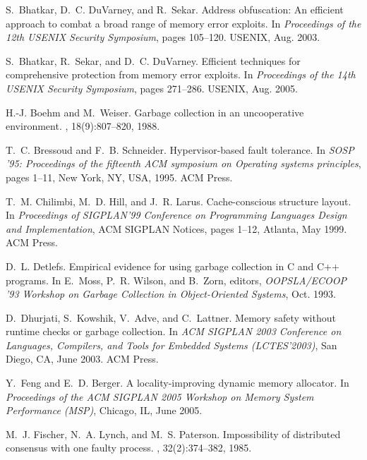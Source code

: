 \documentclass{sig-alternate}
\begin{document}
\begin{thebibliography}{10}
S.~Bhatkar, D.~C. DuVarney, and R.~Sekar.
\newblock Address obfuscation: An efficient approach to combat a broad range of
  memory error exploits.
\newblock In {\em Proceedings of the 12th USENIX Security Symposium}, pages
  105--120. USENIX, Aug. 2003.

S.~Bhatkar, R.~Sekar, and D.~C. DuVarney.
\newblock Efficient techniques for comprehensive protection from memory error
  exploits.
\newblock In {\em Proceedings of the 14th USENIX Security Symposium}, pages
  271--286. USENIX, Aug. 2005.

H.-J. Boehm and M.~Weiser.
\newblock Garbage collection in an uncooperative environment.
, 18(9):807--820, 1988.

T.~C. Bressoud and F.~B. Schneider.
\newblock Hypervisor-based fault tolerance.
\newblock In {\em SOSP '95: Proceedings of the fifteenth ACM symposium on
  Operating systems principles}, pages 1--11, New York, NY, USA, 1995. ACM
  Press.

T.~M. Chilimbi, M.~D. Hill, and J.~R. Larus.
\newblock Cache-conscious structure layout.
\newblock In {\em Proceedings of {SIGPLAN'99} Conference on Programming
  Languages Design and Implementation}, ACM SIGPLAN Notices, pages 1--12,
  Atlanta, May 1999. ACM Press.

D.~L. Detlefs.
\newblock Empirical evidence for using garbage collection in {C} and {C++}
  programs.
\newblock In E.~Moss, P.~R. Wilson, and B.~Zorn, editors, {\em {OOPSLA/ECOOP}
  '93 Workshop on Garbage Collection in Object-Oriented Systems}, Oct. 1993.

D.~Dhurjati, S.~Kowshik, V.~Adve, and C.~Lattner.
\newblock Memory safety without runtime checks or garbage collection.
\newblock In {\em {ACM} {SIGPLAN} 2003 Conference on Languages, Compilers, and
  Tools for Embedded Systems ({LCTES'2003})}, San Diego, CA, June 2003. ACM
  Press.

Y.~Feng and E.~D. Berger.
\newblock A locality-improving dynamic memory allocator.
\newblock In {\em Proceedings of the {ACM SIGPLAN} 2005 Workshop on Memory
  System Performance (MSP)}, Chicago, IL, June 2005.

M.~J. Fischer, N.~A. Lynch, and M.~S. Paterson.
\newblock Impossibility of distributed consensus with one faulty process.
, 32(2):374--382, 1985.


\end{thebibliography}
\end{document}
